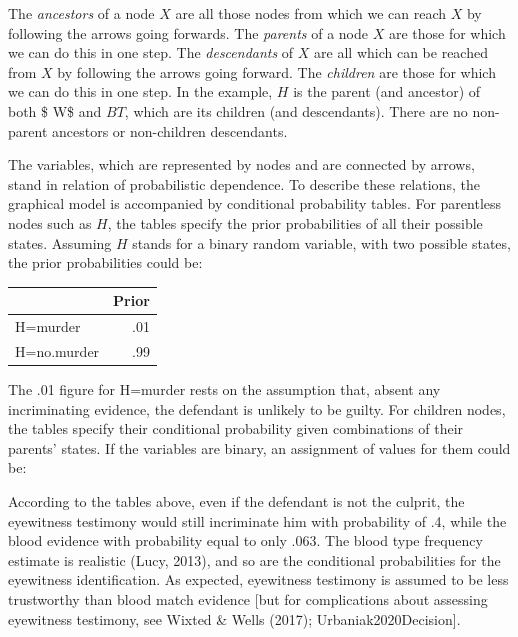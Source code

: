 \documentclass[11pt,dvipsnames,enabledeprecatedfontcommands]{scrartcl}
\begin{document}
The \emph{ancestors} of a node \(X\) are all those nodes from which we
can reach \(X\) by following the arrows going forwards. The
\textit{parents} of a node \(X\) are those for which we can do this in
one step. The \textit{descendants} of \(X\) are all which can be reached
from \(X\) by following the arrows going forward. The \textit{children}
are those for which we can do this in one step. In the example, \(H\) is
the parent (and ancestor) of both \$ W\$ and \(BT\), which are its
children (and descendants). There are no non-parent ancestors or
non-children descendants.

The variables, which are represented by nodes and are connected by
arrows, stand in relation of probabilistic dependence. To describe these
relations, the graphical model is accompanied by conditional probability
tables. For parentless nodes such as \(H\), the tables specify the prior
probabilities of all their possible states. Assuming \(H\) stands for a
binary random variable, with two possible states, the prior
probabilities could be:

\begin{table}[H]
\centering
\begin{tabular}{lr}
\toprule
  & Prior\\
\midrule
H=murder & .01\\
H=no.murder & .99\\
\bottomrule
\end{tabular}
\end{table}

\noindent The .01 figure for H=murder rests on the assumption that,
absent any incriminating evidence, the defendant is unlikely to be
guilty. For children nodes, the tables specify their conditional
probability given combinations of their parents' states. If the
variables are binary, an assignment of values for them could be:

According to the tables above, even if the defendant is not the culprit,
the eyewitness testimony would still incriminate him with probability of
.4, while the blood evidence with probability equal to only .063. The
blood type frequency estimate is realistic (Lucy, 2013), and so are the
conditional probabilities for the eyewitness identification. As
expected, eyewitness testimony is assumed to be less trustworthy than
blood match evidence {[}but for complications about assessing eyewitness
testimony, see Wixted \& Wells (2017); Urbaniak2020Decision{]}.
\end{document}
